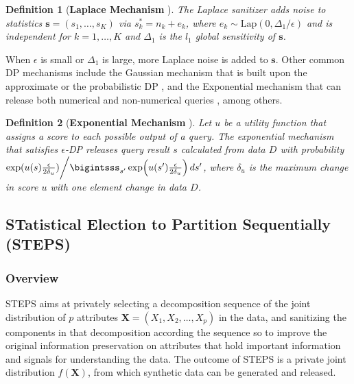 \documentclass[12pt, A4]{article}
\newcommand{\s}{\mathbf{s}}
\theoremstyle{plain}
\theoremstyle{exampstyle}\newtheorem{defn}{Definition}
\theoremstyle{exampstyle}\newtheorem{lem}{Lemma}
\theoremstyle{exampstyle}\newtheorem{cor}{Corollary}
\theoremstyle{exampstyle}\newtheorem{pro}{Proposition}
\theoremstyle{exampstyle}\newtheorem{cla}{Claim}
\theoremstyle{exampstyle}\newtheorem{rem}{Remark}
\begin{document}
\begin{defn}[\textbf{Laplace Mechanism} \citep{dwork2006calibrating}]\label{def:lap}
The Laplace sanitizer adds noise to statistics $\s=(s_1,\ldots,s_K)$ via $s_k^\ast=n_k+e_k$, where $e_k{\sim} \text{Lap}(0,\Delta_1/\epsilon)$ and is independent for $k=1,\ldots,K$ and $\Delta_1$ is the $l_1$ global sensitivity of $\s$.
\end{defn}
When $\epsilon$ is small or $\Delta_1$ is large, more Laplace noise is added to $\s$. Other common DP mechanisms include the Gaussian mechanism that is built upon the approximate or the probabilistic DP \citep{dwork2013algorithmic, liu2016generalized}, and the Exponential mechanism that can release both numerical and non-numerical queries \citep{mcsherry2007mechanism}, among others.

\begin{defn}[\textbf{Exponential Mechanism} \citep{mcsherry2007mechanism}]\label{defn:exponential}
Let $u$ be a utility function that assigns a score to each possible output of a query. The exponential mechanism that satisfies $\epsilon$-DP releases query result $s$ calculated from data $D$ with probability  $\exp(u(s)\frac{\epsilon}{2\delta_u})\bigg/\bigintsss_{s'} \exp\!\left(u(s')\frac{\epsilon}{2\delta_u}\right) ds'$, where $\delta_u$ is the maximum change in score $u$ with one element change in data $D$.
\end{defn}


\subsection{STatistical Election to Partition Sequentially (STEPS)}\label{sec:steps}

\subsubsection{Overview}
STEPS aims at privately selecting a decomposition sequence  of the joint distribution  of $p$ attributes $\mathbf{X}=(X_1,X_2,\ldots,X_p)$ in the  data, and sanitizing the components in that decomposition according the sequence so to improve the original information preservation on attributes that hold important information and signals for understanding the data.  The outcome of STEPS is a private joint distribution $f(\mathbf{X})$, from which synthetic data can be generated and released. 
\end{document}
